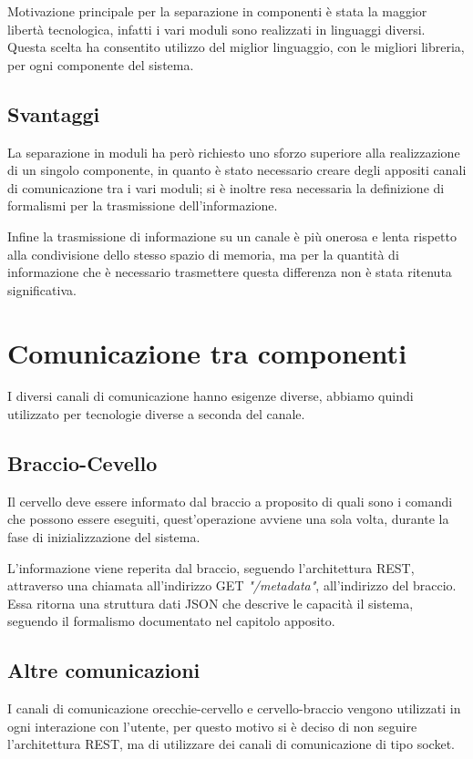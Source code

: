 \documentclass[twoside]{supsistudent}
\begin{document}
Motivazione principale per la separazione in componenti è stata la maggior libertà tecnologica, infatti i vari moduli sono realizzati in linguaggi diversi. 
Questa scelta ha consentito utilizzo del miglior linguaggio, con le migliori libreria, per ogni componente del sistema.

\section{Svantaggi}

La separazione in moduli ha però richiesto uno sforzo superiore alla realizzazione di un singolo componente, in quanto è stato necessario creare degli appositi canali di comunicazione tra i vari moduli; si è inoltre resa necessaria la definizione di formalismi per la trasmissione dell'informazione.

Infine la trasmissione di informazione su un canale è più onerosa e lenta rispetto alla condivisione dello stesso spazio di memoria, ma per la quantità di informazione che è necessario trasmettere questa differenza non è stata ritenuta significativa.

\chapter{Comunicazione tra componenti}
I diversi canali di comunicazione hanno esigenze diverse, abbiamo quindi utilizzato per tecnologie diverse a seconda del canale.
\section{Braccio-Cevello}
Il cervello deve essere informato dal braccio a proposito di quali sono i comandi che possono essere eseguiti, quest'operazione avviene una sola volta, durante la fase di inizializzazione del sistema.

L'informazione viene reperita dal braccio, seguendo l'architettura REST, attraverso una chiamata all'indirizzo GET \textit{"/metadata"}, all'indirizzo del braccio. Essa ritorna una struttura dati JSON che descrive le capacità il sistema, seguendo il formalismo documentato nel capitolo apposito.
\section{Altre comunicazioni}
I canali di comunicazione orecchie-cervello e cervello-braccio vengono utilizzati in ogni interazione con l'utente, per questo motivo si è deciso di non seguire l'architettura REST, ma di utilizzare dei canali di comunicazione di tipo socket.
\end{document}
